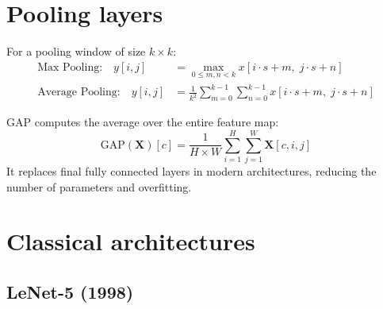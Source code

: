 \section{Pooling layers}
\label{sec:pooling}

\begin{keyformulas}[title=\textbf{Pooling operations}]
For a pooling window of size $k \times k$:
\begin{align}
\text{Max Pooling:} \quad y[i,j] &= \max_{0 \leq m,n < k} x[i \cdot s + m,\; j \cdot s + n]
\label{eq:maxpool} \\
\text{Average Pooling:} \quad y[i,j] &= \frac{1}{k^2} \sum_{m=0}^{k-1} \sum_{n=0}^{k-1}
  x[i \cdot s + m,\; j \cdot s + n]
\label{eq:avgpool}
\end{align}
\end{keyformulas}

\begin{definition}
GAP computes the average over the entire feature map:
\begin{equation}
\text{GAP}(\mathbf{X})[c] = \frac{1}{H \times W} \sum_{i=1}^{H} \sum_{j=1}^{W}
  \mathbf{X}[c, i, j]
\end{equation}
It replaces final fully connected layers in modern architectures,
reducing the number of parameters and overfitting.
\end{definition}

\section{Classical architectures}
\label{sec:classic-archs}

\subsection{LeNet-5 (1998)}

